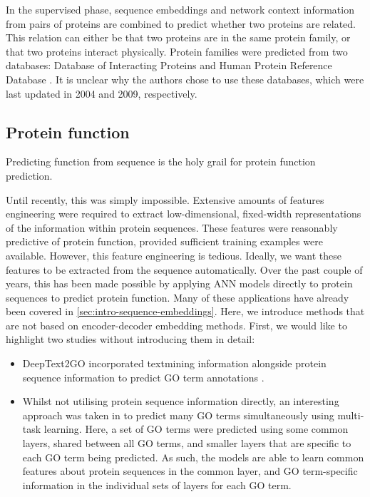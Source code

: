 In the supervised phase, sequence embeddings and network context information from pairs of proteins are combined to predict whether two proteins are related. This relation can either be that two proteins are in the same protein family, or that two proteins interact physically. Protein families were predicted from two databases: Database of Interacting Proteins \cite{Salwinski2004} and Human Protein Reference Database \cite{KeshavaPrasad2009}. It is unclear why the authors chose to use these databases, which were last updated in 2004 and 2009, respectively.

\subsection{Protein function}

Predicting function from sequence is the holy grail for protein function prediction.

Until recently, this was simply impossible. Extensive amounts of features engineering were required to extract low-dimensional, fixed-width representations of the information within protein sequences. These features were reasonably predictive of protein function, provided sufficient training examples were available. However, this feature engineering is tedious. Ideally, we want these features to be extracted from the sequence automatically. Over the past couple of years, this has been made possible by applying ANN models directly to protein sequences to predict protein function. Many of these applications have already been covered in \ref{sec:intro-sequence-embeddings}. Here, we introduce methods that are not based on encoder-decoder embedding methods. First, we would like to highlight two studies without introducing them in detail:

\begin{itemize}
\item DeepText2GO incorporated textmining information alongside protein sequence information to predict GO term annotations \cite{You2018a}.
\item Whilst not utilising protein sequence information directly, an interesting approach was taken in \cite{Fa2018} to predict many GO terms simultaneously using multi-task learning. Here, a set of GO terms were predicted using some common layers, shared between all GO terms, and smaller layers that are specific to each GO term being predicted. As such, the models are able to learn common features about protein sequences in the common layer, and GO term-specific information in the individual sets of layers for each GO term.
\end{itemize}

